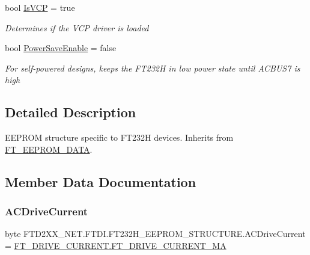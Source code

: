 \begin{DoxyCompactItemize}
bool \mbox{\hyperlink{class_f_t_d2_x_x___n_e_t_1_1_f_t_d_i_1_1_f_t232_h___e_e_p_r_o_m___s_t_r_u_c_t_u_r_e_a00f525ee1501603e48521999e26a4c25}{Is\+V\+CP}} = true
\begin{DoxyCompactList}\small\item\em Determines if the V\+CP driver is loaded \end{DoxyCompactList}\item 
bool \mbox{\hyperlink{class_f_t_d2_x_x___n_e_t_1_1_f_t_d_i_1_1_f_t232_h___e_e_p_r_o_m___s_t_r_u_c_t_u_r_e_aa00cc3ab6d2795bf68abeb5da711cccc}{Power\+Save\+Enable}} = false
\begin{DoxyCompactList}\small\item\em For self-\/powered designs, keeps the F\+T232H in low power state until A\+C\+B\+U\+S7 is high \end{DoxyCompactList}\end{DoxyCompactItemize}


\subsection{Detailed Description}
E\+E\+P\+R\+OM structure specific to F\+T232H devices. Inherits from \mbox{\hyperlink{class_f_t_d2_x_x___n_e_t_1_1_f_t_d_i_1_1_f_t___e_e_p_r_o_m___d_a_t_a}{F\+T\+\_\+\+E\+E\+P\+R\+O\+M\+\_\+\+D\+A\+TA}}. 



\subsection{Member Data Documentation}
\mbox{\label{class_f_t_d2_x_x___n_e_t_1_1_f_t_d_i_1_1_f_t232_h___e_e_p_r_o_m___s_t_r_u_c_t_u_r_e_ad598a38530c322e1c64312048e68c70a}} 
\subsubsection{\texorpdfstring{ACDriveCurrent}{ACDriveCurrent}}
{\footnotesize\ttfamily byte F\+T\+D2\+X\+X\+\_\+\+N\+E\+T.\+F\+T\+D\+I.\+F\+T232\+H\+\_\+\+E\+E\+P\+R\+O\+M\+\_\+\+S\+T\+R\+U\+C\+T\+U\+R\+E.\+A\+C\+Drive\+Current = \mbox{\hyperlink{class_f_t_d2_x_x___n_e_t_1_1_f_t_d_i_1_1_f_t___d_r_i_v_e___c_u_r_r_e_n_t_af6b404bcc6f2eb88bbc95b183d5729ea}{F\+T\+\_\+\+D\+R\+I\+V\+E\+\_\+\+C\+U\+R\+R\+E\+N\+T.\+F\+T\+\_\+\+D\+R\+I\+V\+E\+\_\+\+C\+U\+R\+R\+E\+N\+T\+\_\+MA}}}



